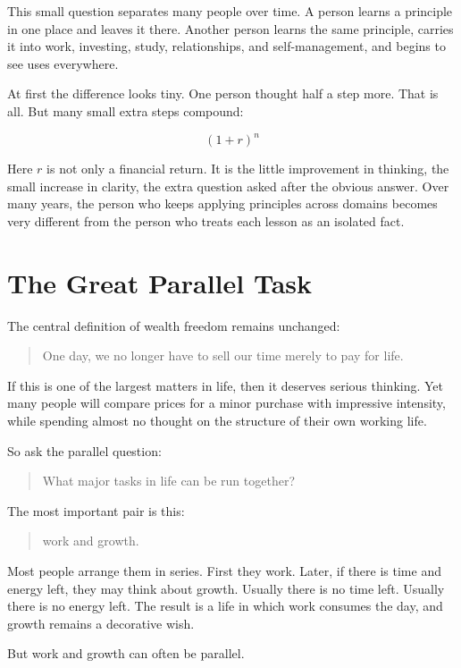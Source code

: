 This small question separates many people over time. A person learns a principle in one place and leaves it there. Another person learns the same principle, carries it into work, investing, study, relationships, and self-management, and begins to see uses everywhere.

At first the difference looks tiny. One person thought half a step more. That is all. But many small extra steps compound:

\[
(1+r)^n
\]

Here \(r\) is not only a financial return. It is the little improvement in thinking, the small increase in clarity, the extra question asked after the obvious answer. Over many years, the person who keeps applying principles across domains becomes very different from the person who treats each lesson as an isolated fact.

\section*{The Great Parallel Task}

The central definition of wealth freedom remains unchanged:

\begin{quote}
One day, we no longer have to sell our time merely to pay for life.
\end{quote}

If this is one of the largest matters in life, then it deserves serious thinking. Yet many people will compare prices for a minor purchase with impressive intensity, while spending almost no thought on the structure of their own working life.

So ask the parallel question:

\begin{quote}
What major tasks in life can be run together?
\end{quote}

The most important pair is this:

\begin{quote}
work and growth.
\end{quote}

Most people arrange them in series. First they work. Later, if there is time and energy left, they may think about growth. Usually there is no time left. Usually there is no energy left. The result is a life in which work consumes the day, and growth remains a decorative wish.

But work and growth can often be parallel.

